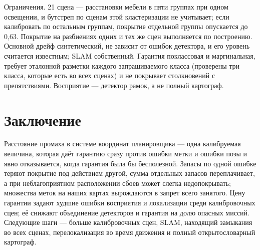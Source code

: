 \documentclass[conference,a4paper]{IEEEtran}
\theoremstyle{definition}
\begin{document}
Ограничения. 21 сцена --- расстановки мебели в пяти группах при одном освещении, и бутстреп по сценам этой
кластеризации не учитывает; если калибровать по остальным группам, покрытие отдельной группы опускается до 0,63. Покрытие на
разбиениях одних и тех же сцен выполняется по построению. Основной дрейф синтетический, не зависит от ошибок детектора,
и его уровень считается известным; SLAM собственный. Гарантия поклассовая и маргинальная, требует эталонной разметки
каждого запрашиваемого класса (проверены три класса, которые есть во всех сценах) и не покрывает столкновений с
препятствиями. Восприятие --- детектор рамок, а не полный картограф.

\section{Заключение}

Расстояние промаха в системе координат планировщика --- одна калибруемая величина, которая даёт гарантию сразу против
ошибки метки и ошибки позы и явно отказывается, когда гарантия была бы бесполезной. Запасы по одной ошибке теряют
покрытие под действием другой, сумма отдельных запасов переплачивает, а при неблагоприятном расположении сбоев может
слегка недопокрывать; множества меток на наших картах вырождаются в запрет всего занятого. Цену гарантии задают худшие
ошибки восприятия и локализации среди калибровочных сцен; её снижают объединение детекторов и гарантия на долю опасных
миссий. Следующие шаги --- больше калибровочных сцен, SLAM, находящий замыкания во всех сценах, перелокализация во время
движения и полный открытословарный картограф.
\end{document}
